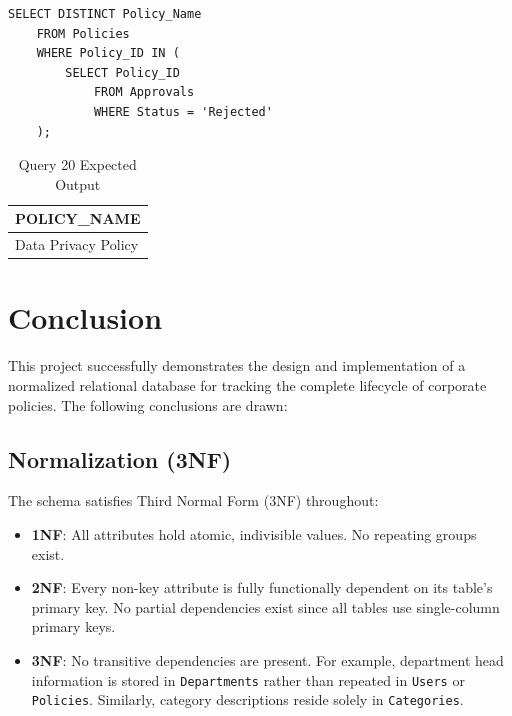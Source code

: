 \documentclass[conference]{IEEEtran}
\begin{document}
\begin{lstlisting}[style=sqlstyle, caption={Query 20: Rejected Policies (DISTINCT + Subquery)}]
SELECT DISTINCT Policy_Name
    FROM Policies
    WHERE Policy_ID IN (
        SELECT Policy_ID
            FROM Approvals
            WHERE Status = 'Rejected'
    );
\end{lstlisting}

\begin{table}[H]
\centering
\caption{Query 20 Expected Output}
\begin{tabular}{|l|}
\hline
\textbf{POLICY\_NAME} \\
\hline
Data Privacy Policy \\
\hline
\end{tabular}
\end{table}

\section{Conclusion}

This project successfully demonstrates the design and implementation of a normalized relational database for tracking the complete lifecycle of corporate policies. The following conclusions are drawn:

\subsection{Normalization (3NF)}
The schema satisfies Third Normal Form (3NF) throughout:
\begin{itemize}
  \item \textbf{1NF}: All attributes hold atomic, indivisible values. No repeating groups exist.
  \item \textbf{2NF}: Every non-key attribute is fully functionally dependent on its table's primary key. No partial dependencies exist since all tables use single-column primary keys.
  \item \textbf{3NF}: No transitive dependencies are present. For example, department head information is stored in \texttt{Departments} rather than repeated in \texttt{Users} or \texttt{Policies}. Similarly, category descriptions reside solely in \texttt{Categories}.
\end{itemize}
\end{document}

